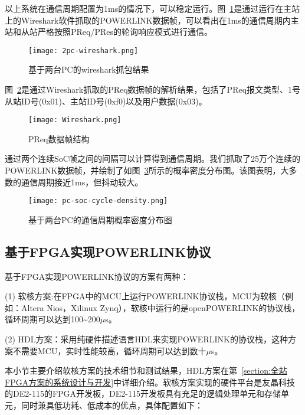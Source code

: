 以上系统在通信周期配置为1ms的情况下，可以稳定运行。图~\ref{fig:2pc-wireshark}是通过运行在主站上的Wireshark软件抓取的POWERLINK数据帧，可以看出在1ms的通信周期内主站和从站严格按照PReq/PRes的轮询响应模式进行通信。

\begin{figure}[!htb]
  \centering
  \texttt{[image: 2pc-wireshark.png]}
  \caption{基于两台PC的wireshark抓包结果}
  \label{fig:2pc-wireshark}
\end{figure}

图~\ref{fig:Wireshark}是通过Wireshark抓取的PReq数据帧的解析结果，包括了PReq报文类型、1号从站ID号(0x01)、主站ID号(0xf0)以及用户数据(0x03)。

\begin{figure}[!htb]
  \centering
  \texttt{[image: Wireshark.png]}
  \caption{PReq数据帧结构}
  \label{fig:Wireshark}
\end{figure}

通过两个连续SoC帧之间的间隔可以计算得到通信周期。我们抓取了25万个连续的POWERLINK数据帧，并绘制了如图~\ref{fig:pc-soc-cycle-density}所示的概率密度分布图。该图表明，大多数的通信周期接近1ms，但抖动较大。


\begin{figure}[!htb]
  \centering
  \texttt{[image: pc-soc-cycle-density.png]}
  \caption{基于两台PC的通信周期概率密度分布图}
  \label{fig:pc-soc-cycle-density}
\end{figure}

\subsection{基于FPGA实现POWERLINK协议}
\label{subsection:基于FPGA实现POWERLINK协议}

基于FPGA实现POWERLINK协议的方案有两种\cite{xiao}：

(1) 软核方案:在FPGA中的MCU上运行POWERLINK协议栈，MCU为软核（例如：Altera Nios，Xilinux Zynq），软核中运行的是openPOWERLINK的协议栈，循环周期可以达到100\~{}200$\mu$s。

(2) HDL方案：采用纯硬件描述语言HDL来实现POWERLINK的协议栈，这种方案不需要MCU，实时性能较高，循环周期可以达到数十$\mu$s。

本小节主要介绍软核方案的技术细节和测试结果，HDL方案在第~\ref{section:全站FPGA方案的系统设计与开发}中详细介绍。软核方案实现的硬件平台是友晶科技的DE2-115的FPGA开发板，DE2-115开发板具有充足的逻辑处理单元和存储单元，同时兼具低功耗、低成本的优点，具体配置如下：


